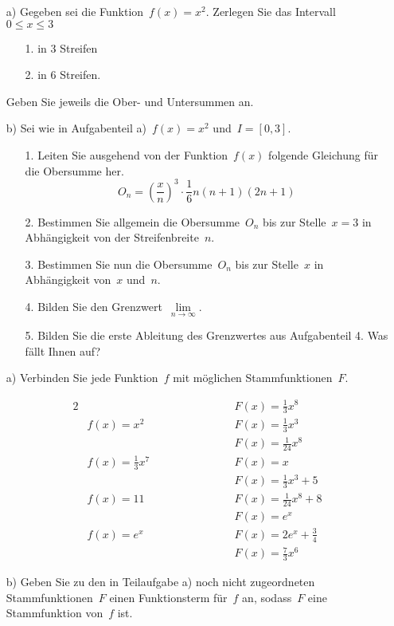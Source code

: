 \begin{itemize}
\item[a)] Gegeben sei die Funktion~$f(x)=x^2$. Zerlegen Sie das Intervall~$0 \leq x \leq 3$
	\begin{itemize}
		\item[1.] in 3 Streifen
		\item[2.] in 6 Streifen.
	\end{itemize}
Geben Sie jeweils die Ober- und Untersummen an.
\item[b)] Sei wie in Aufgabenteil a)~$f(x)=x^2$ und~$I=\left[0,3\right]$.
	\begin{itemize}
		\item[1.] Leiten Sie ausgehend von der Funktion~$f(x)$ folgende Gleichung für die Obersumme her.
		\begin{equation*}
			O_n = \left(\frac{x}{n}\right)^3 \cdot \frac{1}{6} n \left(n + 1\right)\left(2n + 1\right)
		\end{equation*}
		\item[2.] Bestimmen Sie allgemein die Obersumme~$O_n$ bis zur Stelle~$x=3$ in Abhängigkeit von der Streifenbreite~$n$.
		\item[3.] Bestimmen Sie nun die Obersumme~$O_n$ bis zur Stelle~$x$ in Abhängigkeit von~$x$ und~$n$.
		\item[4.] Bilden Sie den Grenzwert~$\lim\limits_{n \to \infty}$.
		\item[5.] Bilden Sie die erste Ableitung des Grenzwertes aus Aufgabenteil 4. Was fällt Ihnen auf?
	\end{itemize}
\end{itemize}
\begin{itemize}
	\item[a)] Verbinden Sie jede Funktion~$f$ mit möglichen Stammfunktionen~$F$.
	
	\begin{alignat*}{2}
		&						 \qquad \qquad \qquad && F(x)= \frac{1}{3} x^8\\
		&f(x)= x^2				 \qquad \qquad \qquad && F(x)= \frac{1}{3} x^3\\
		&						 \qquad \qquad \qquad && F(x)= \frac{1}{24} x^8\\
		&f(x)= \frac{1}{3} x^7	 \qquad \qquad \qquad && F(x)= x\\
		&						 \qquad \qquad \qquad && F(x)= \frac{1}{3} x^3 + 5\\
		&f(x)= 11				 \qquad \qquad \qquad && F(x)= \frac{1}{24} x^8 + 8\\
		&						 \qquad \qquad \qquad && F(x)= e^x\\
		&f(x)= e^x				 \qquad \qquad \qquad && F(x)= 2 e^x + \frac{3}{4}\\
		&						 \qquad \qquad \qquad && F(x)= \frac{7}{3} x^6
	\end{alignat*}
	\item[b)] Geben Sie zu den in Teilaufgabe a) noch nicht zugeordneten Stammfunktionen~$F$ einen Funktionsterm für~$f$ an, sodass~$F$ eine Stammfunktion von~$f$ ist.
	\end{itemize}
